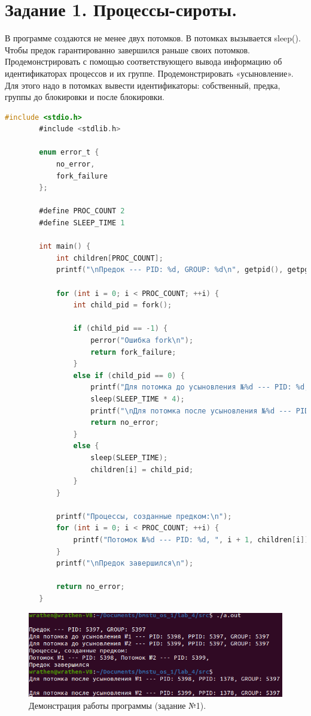 \documentclass[12pt]{report}
\begin{document}
    
    
    \section*{Задание 1. Процессы-сироты.}
    В программе создаются не менее двух потомков.
    В потомках вызывается sleep().
    Чтобы предок гарантированно завершился раньше своих потомков.
    Продемонстрировать с помощью соответствующего вывода информацию об идентификаторах процессов и их группе.
    Продемонстрировать «усыновление».
    Для этого надо в потомках вывести идентификаторы:
    собственный, предка, группы до блокировки и после блокировки.
    
    \begin{lstlisting}[label=code:fork, caption=Процессы-сироты, language=C]
	    #include <stdio.h>
	    #include <stdlib.h>
	    
	    enum error_t {
	    	no_error,
	    	fork_failure
	    };
	    
	    #define PROC_COUNT 2
	    #define SLEEP_TIME 1
	    
	    int main() {
	    	int children[PROC_COUNT];
	    	printf("\nПредок --- PID: %d, GROUP: %d\n", getpid(), getpgrp());
	    	
	    	for (int i = 0; i < PROC_COUNT; ++i) {
	    		int child_pid = fork();
	    		
	    		if (child_pid == -1) {
	    			perror("Ошибка fork\n");
	    			return fork_failure;
	    		}
	    		else if (child_pid == 0) {
	    			printf("Для потомка до усыновления №%d --- PID: %d, PPID: %d, GROUP: %d\n", i + 1, getpid(), getppid(), getpgrp());
	    			sleep(SLEEP_TIME * 4);
	    			printf("\nДля потомка после усыновления №%d --- PID: %d, PPID: %d, GROUP: %d\n", i + 1, getpid(), getppid(), getpgrp());
	    			return no_error;
	    		}
	    		else {
	    			sleep(SLEEP_TIME);
	    			children[i] = child_pid;
	    		}
	    	}
	    	
	    	printf("Процессы, созданные предком:\n");
	    	for (int i = 0; i < PROC_COUNT; ++i) {
	    		printf("Потомок №%d --- PID: %d, ", i + 1, children[i]);
	    	}
	    	printf("\nПредок завершился\n");
	    	
	    	return no_error;
	    }
    \end{lstlisting}

	\begin{figure}[H]
		
		\centering
		
		\includegraphics[width=\linewidth]{img/task_01.png}
		\caption{Демонстрация работы программы (задание №1).}
		
		\label{fig:task_01}
		
	\end{figure}
\end{document}
